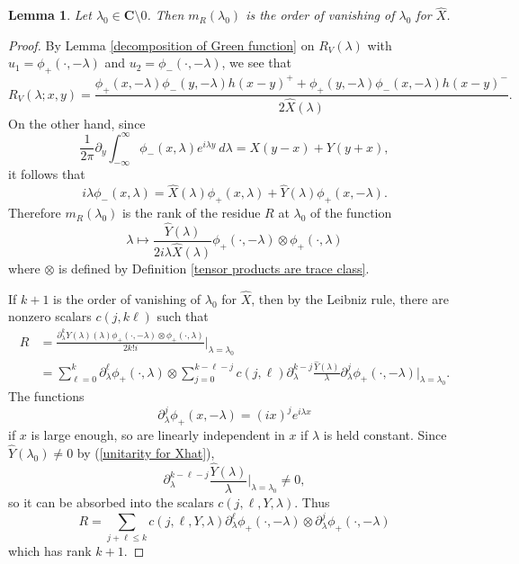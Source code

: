 \documentclass[12pt]{report}
\newcommand{\CC}{\mathbf{C}}
\newtheorem{lemma}[theorem]{Lemma}
\theoremstyle{definition}
\begin{document}
\begin{lemma}
\label{scattering resonances are Xhat zeroes}
Let $\lambda_0 \in \CC \setminus 0$. Then $m_R(\lambda_0)$ is the order of vanishing of $\lambda_0$ for $\hat X$.
\end{lemma}
\begin{proof}
By Lemma \ref{decomposition of Green function} on $R_V(\lambda)$ with $u_1 = \phi_+(\cdot, -\lambda)$ and $u_2 = \phi_-(\cdot, -\lambda)$, we see that
$$R_V(\lambda; x, y)= \frac{\phi_+(x, -\lambda)\phi_-(y, -\lambda)h(x -y)^+ + \phi_+(y, -\lambda)\phi_-(x, -\lambda)h(x-y)^-}{2\hat X(\lambda)}.$$
On the other hand, since
$$\frac{1}{2\pi} \partial_y \int_{-\infty}^\infty \phi_-(x, \lambda)e^{i\lambda y} ~d\lambda = X(y - x) + Y(y + x),$$
it follows that
$$i\lambda\phi_-(x, \lambda) = \hat X(\lambda)\phi_+(x, \lambda) + \hat Y(\lambda)\phi_+(x, -\lambda).$$
Therefore $m_R(\lambda_0)$ is the rank of the residue $R$ at $\lambda_0$ of the function
$$\lambda \mapsto \frac{\hat Y(\lambda)}{2i\lambda\hat X(\lambda)}\phi_+(\cdot, -\lambda)\otimes \phi_+(\cdot, \lambda)$$
where $\otimes$ is defined by Definition \ref{tensor products are trace class}.

If $k+1$ is the order of vanishing of $\lambda_0$ for $\hat X$, then by the Leibniz rule, there are nonzero scalars $c(j, k \ell)$ such that
\begin{align*}
R &= \frac{\partial_\lambda^k \hat Y(\lambda)(\lambda)\phi_+(\cdot, -\lambda) \otimes \phi_+(\cdot, \lambda)}{2k!i}\bigg|_{\lambda = \lambda_0}\\
&= \sum_{\ell=0}^k \partial^\ell_\lambda \phi_+(\cdot, \lambda) \otimes \sum_{j=0}^{k-\ell-j}c(j, \ell) \partial_\lambda^{k-j} \frac{\hat Y(\lambda)}{\lambda} \partial_\lambda^j \phi_+(\cdot, -\lambda)\bigg|_{\lambda = \lambda_0}.
\end{align*}
The functions
$$\partial^j_\lambda \phi_+(x, -\lambda) = (ix)^je^{i\lambda x}$$
if $x$ is large enough, so are linearly independent in $x$ if $\lambda$ is held constant.
Since $\hat Y(\lambda_0) \neq 0$ by (\ref{unitarity for Xhat}),
$$\partial_\lambda^{k-\ell-j} \frac{\hat Y(\lambda)}{\lambda}\bigg|_{\lambda = \lambda_0} \neq 0,$$
so it can be absorbed into the scalars $c(j, \ell, Y, \lambda)$. Thus
$$R = \sum_{j+\ell \leq k} c(j, \ell, Y, \lambda) \partial^\ell_\lambda \phi_+(\cdot, -\lambda) \otimes \partial^j_\lambda \phi_+(\cdot, -\lambda)$$
which has rank $k + 1$.
\end{proof}
\end{document}
